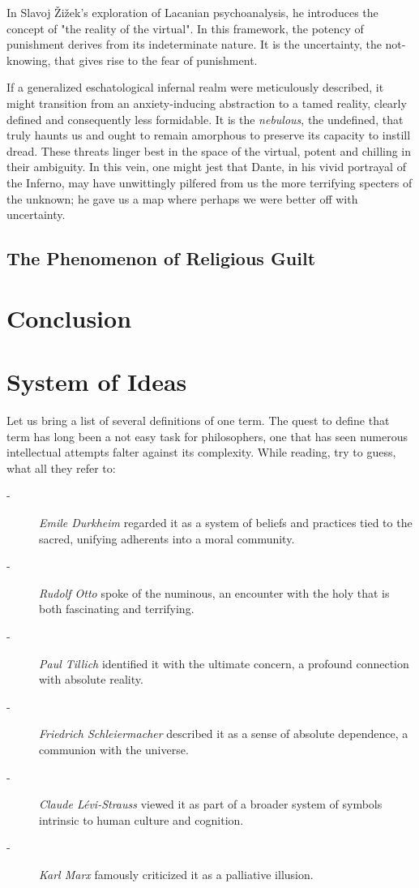 \documentclass[12pt,a4]{article}
\begin{document}
        In Slavoj Žižek's exploration of Lacanian psychoanalysis, he introduces the concept of "the reality of the virtual".
        In this framework, the potency of punishment derives from its indeterminate nature. It is the uncertainty, the not-knowing, that gives rise to the fear of punishment. 
        \par
        If a generalized eschatological infernal realm were meticulously described, it might transition from an anxiety-inducing abstraction to a tamed reality, clearly defined and consequently less formidable. It is the \textit{nebulous}, the undefined, that truly haunts us and ought to remain amorphous to preserve its capacity to instill dread. These threats linger best in the space of the virtual, potent and chilling in their ambiguity. In this vein, one might jest that Dante, in his vivid portrayal of the Inferno, may have unwittingly pilfered from us the more terrifying specters of the unknown; he gave us a map where perhaps we were better off with uncertainty.
        

    \subsection{The Phenomenon of Religious Guilt}
    
\section{Conclusion}





 
\section{System of Ideas}
Let us bring a list of several definitions of one term. The quest to define that term has long been a not easy task for philosophers, one that has seen numerous intellectual attempts falter against its complexity. 
While reading, try to guess, what all they refer to:  

\begin{description}
    \item[-] \textit{Emile Durkheim} regarded it as a system of beliefs and practices tied to the sacred, unifying adherents into a moral community.
    \item[-] \textit{Rudolf Otto} spoke of the numinous, an encounter with the holy that is both fascinating and terrifying.
    \item[-] \textit{Paul Tillich }identified it with the ultimate concern, a profound connection with absolute reality.
    \item[-] \textit{Friedrich Schleiermacher} described it as a sense of absolute dependence, a communion with the universe.
    \item[-] \textit{Claude Lévi-Strauss} viewed it as part of a broader system of symbols intrinsic to human culture and cognition.
    \item[-] \textit{Karl Marx} famously criticized it as a palliative illusion.
\end{description}    
\end{document}
